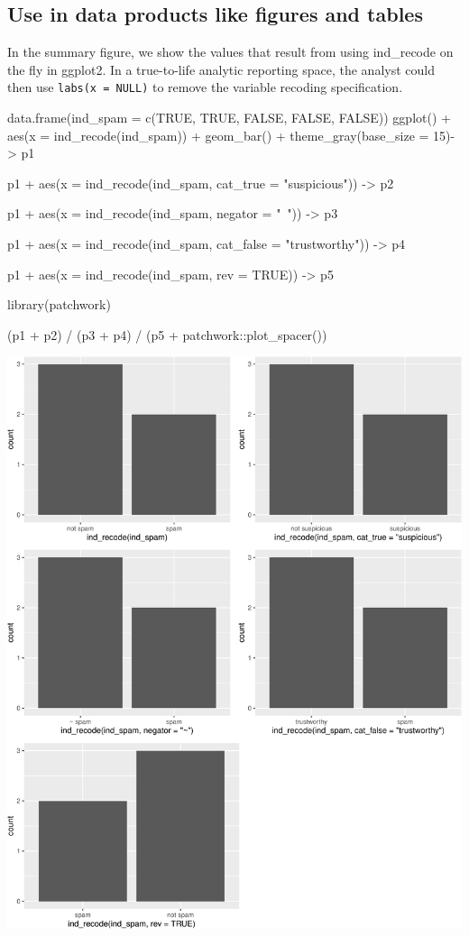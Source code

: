 \hypertarget{use-in-data-products-like-figures-and-tables}{%
\subsection{Use in data products like figures and
tables}\label{use-in-data-products-like-figures-and-tables}}

In the summary figure, we show the values that result from using
ind\_recode on the fly in ggplot2. In a true-to-life analytic reporting
space, the analyst could then use \texttt{labs(x\ =\ NULL)} to remove
the variable recoding specification.

\begin{Schunk}
\begin{Sinput}
data.frame(ind_spam = c(TRUE, TRUE, FALSE, FALSE, FALSE)) %
ggplot() + 
  aes(x = ind_recode(ind_spam)) + 
  geom_bar() +
  theme_gray(base_size = 15)->
p1

p1 +
  aes(x = ind_recode(ind_spam, cat_true = "suspicious")) ->
p2

p1 +
  aes(x = ind_recode(ind_spam, negator = "~")) ->
p3

p1 +
  aes(x = ind_recode(ind_spam, cat_false = "trustworthy")) ->
p4


p1 +
  aes(x = ind_recode(ind_spam, rev = TRUE)) ->
p5

library(patchwork)

(p1 + p2) /
  (p3 + p4) /
  (p5 + patchwork::plot_spacer())
\end{Sinput}

\includegraphics[width=0.69\linewidth]{r_journal_files/figure-latex/visual_ind2cat_customization_in_visualizations-1} \end{Schunk}

